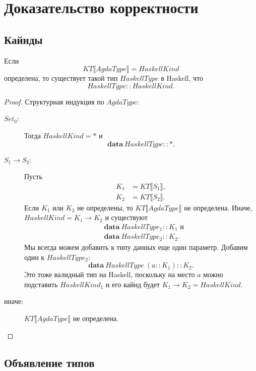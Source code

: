 \section{Доказательство корректности}\label{sec:appendix-proof}

\subsection{Кайнды}

\begin{thm}
Если
\[
KT\llbracket AgdaType \rrbracket = HaskellKind
\]
определена, то существует такой тип \(HaskellType\) в Haskell, что
\[
HaskellType :: HaskellKind.
\]
\end{thm}

\begin{proof}
Структурная индукция по \(AgdaType\):
\begin{description}
\item[\(Set_0\):] Тогда \(HaskellKind = *\) и
   \[
   \mathbf{data}\ HaskellType :: *.
   \]
\item[\(S_1 \rightarrow S_2\):] Пусть
   \begin{align*}
   K_1 &= KT\llbracket S_1 \rrbracket,\\
   K_2 &= KT\llbracket S_2 \rrbracket.
   \end{align*}
   Если \(K_1\) или \(K_2\) не определены, то \(KT\llbracket AgdaType \rrbracket\)
   не определена. Иначе, \(HaskellKind = K_1 \rightarrow K_2\) и существуют
   \begin{align*}
   &\mathbf{data}\ HaskellType_1 :: K_1\text{ и}\\
   &\mathbf{data}\ HaskellType_2 :: K_2.
   \end{align*}
   Мы всегда можем добавить к типу данных еще один параметр. Добавим один к
   \(HaskellType_2\):
   \[
   \mathbf{data}\ HaskellType\ (a :: K_1) :: K_2.
   \]
   Это тоже валидный тип на Haskell, поскольку на место \(a\) можно подставить
   \(HaskellKind_1\) и его кайнд будет \(K_1 \rightarrow K_2 = HaskellKind\).
\item[\textnormal{иначе}:] \(KT\llbracket AgdaType \rrbracket\) не определена.
\end{description}
\end{proof}

\subsection{Объявление типов}

